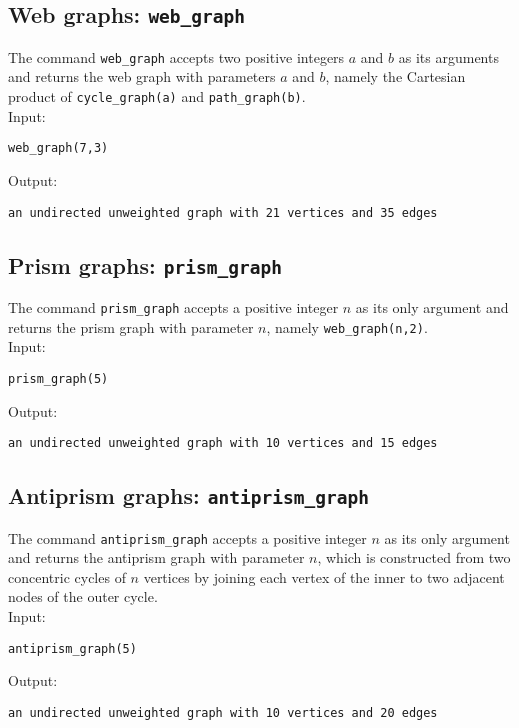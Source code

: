 \documentclass[a4paper,11pt]{article}
\begin{document}
\subsection{Web graphs: {\tt web\_graph}}

The command {\tt web\_graph} accepts two positive integers $ a $ and $ b $ as its arguments and returns the web graph with parameters $ a $ and $ b $, namely the Cartesian product of {\tt cycle\_graph(a)} and {\tt path\_graph(b)}.\\
Input:
\begin{center}
  \tt web\_graph(7,3)
\end{center}
Output:
\begin{center}
  \tt an undirected unweighted graph with 21 vertices and 35 edges
\end{center}

\subsection{Prism graphs: {\tt prism\_graph}}

The command {\tt prism\_graph} accepts a positive integer $ n $ as its only argument and returns the prism graph with parameter $ n $, namely {\tt web\_graph(n,2)}.\\
Input:
\begin{center}
  \tt prism\_graph(5)
\end{center}
Output:
\begin{center}
  \tt an undirected unweighted graph with 10 vertices and 15 edges
\end{center}

\subsection{Antiprism graphs: {\tt antiprism\_graph}}

The command {\tt antiprism\_graph} accepts a positive integer $ n $ as its only argument and returns the antiprism graph with parameter $ n $, which is constructed from two concentric cycles of $ n $ vertices by joining each vertex of the inner to two adjacent nodes of the outer cycle.\\
Input:
\begin{center}
  \tt antiprism\_graph(5)
\end{center}
Output:
\begin{center}
  \tt an undirected unweighted graph with 10 vertices and 20 edges
\end{center}
\end{document}
